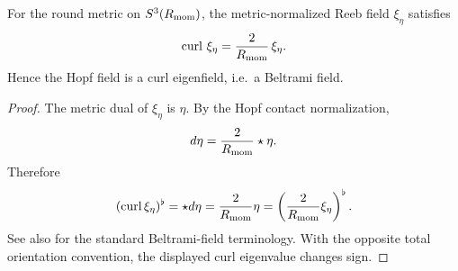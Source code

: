 \documentclass[11pt]{article}
\begin{document}
\begin{proposition}
\label{p1:prop:hopf-reeb-beltrami}
For the round metric on \(S^3(R_{\mathrm{mom}})\), the metric-normalized Reeb field \(\xi_\eta\) satisfies
\[
\operatorname{curl}\,\xi_\eta = \frac{2}{R_{\mathrm{mom}}}\,\xi_\eta.
\]
Hence the Hopf field is a curl eigenfield, i.e.\ a Beltrami field.
\end{proposition}

\begin{proof}
The metric dual of \(\xi_\eta\) is \(\eta\).  By the Hopf contact normalization,
\[
    d\eta=\frac{2}{R_{\mathrm{mom}}}\star\eta.
\]
Therefore
\[
    (\operatorname{curl}\xi_\eta)^\flat=\star d\eta
    =\frac{2}{R_{\mathrm{mom}}}\eta
    =\left(\frac{2}{R_{\mathrm{mom}}}\xi_\eta\right)^\flat.
\]
See also \cite{blair2010contact,peraltaSalasSlobodeanu2020beltrami} for the standard Beltrami-field terminology.  With the opposite total orientation convention, the displayed curl eigenvalue changes sign.
\end{proof}


\newpage
\end{document}
